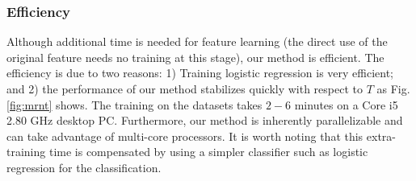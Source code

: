  \subsubsection{Efficiency}
 Although additional time is needed for feature learning (the direct use of
 the original feature needs no training at this stage), our method is efficient. The efficiency is due to two reasons: 1) Training
 logistic regression is very efficient; and 2) the performance of our
 method stabilizes quickly with respect to $T$ as Fig.\ref{fig:mrnt}
 shows. The training on the datasets takes $2-6$ minutes on a Core i5
 2.80 GHz desktop PC. Furthermore, our method is inherently
 parallelizable and can take advantage of multi-core processors. It is
 worth noting that this extra-training time is compensated by using a
 simpler classifier such as logistic regression for the
 classification.



